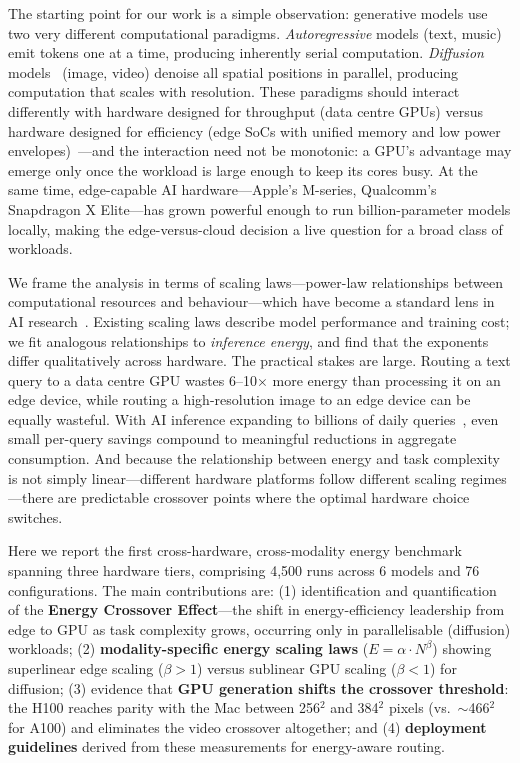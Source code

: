 \documentclass[preprint,12pt]{elsarticle}
\begin{document}
The starting point for our work is a simple observation: generative models use two very different computational paradigms. \textit{Autoregressive} models (text, music) emit tokens one at a time, producing inherently serial computation. \textit{Diffusion} models~\cite{rombach2022high} (image, video) denoise all spatial positions in parallel, producing computation that scales with resolution. These paradigms should interact differently with hardware designed for throughput (data centre GPUs) versus hardware designed for efficiency (edge SoCs with unified memory and low power envelopes)~\cite{mao2024green}---and the interaction need not be monotonic: a GPU's advantage may emerge only once the workload is large enough to keep its cores busy. At the same time, edge-capable AI hardware---Apple's M-series, Qualcomm's Snapdragon X Elite---has grown powerful enough to run billion-parameter models locally, making the edge-versus-cloud decision a live question for a broad class of workloads.

We frame the analysis in terms of scaling laws---power-law relationships between computational resources and behaviour---which have become a standard lens in AI research~\cite{kaplan2020scaling}. Existing scaling laws describe model performance and training cost; we fit analogous relationships to \textit{inference energy}, and find that the exponents differ qualitatively across hardware. The practical stakes are large. Routing a text query to a data centre GPU wastes 6--10$\times$ more energy than processing it on an edge device, while routing a high-resolution image to an edge device can be equally wasteful. With AI inference expanding to billions of daily queries~\cite{devries2023growing}, even small per-query savings compound to meaningful reductions in aggregate consumption. And because the relationship between energy and task complexity is not simply linear---different hardware platforms follow different scaling regimes---there are predictable crossover points where the optimal hardware choice switches.

Here we report the first cross-hardware, cross-modality energy benchmark spanning three hardware tiers, comprising 4,500 runs across 6 models and 76 configurations. The main contributions are: (1) identification and quantification of the \textbf{Energy Crossover Effect}---the shift in energy-efficiency leadership from edge to GPU as task complexity grows, occurring only in parallelisable (diffusion) workloads; (2) \textbf{modality-specific energy scaling laws} ($E = \alpha \cdot N^\beta$) showing superlinear edge scaling ($\beta > 1$) versus sublinear GPU scaling ($\beta < 1$) for diffusion; (3) evidence that \textbf{GPU generation shifts the crossover threshold}: the H100 reaches parity with the Mac between 256$^2$ and 384$^2$ pixels (vs.\ $\sim$466$^2$ for A100) and eliminates the video crossover altogether; and (4) \textbf{deployment guidelines} derived from these measurements for energy-aware routing.
\end{document}
